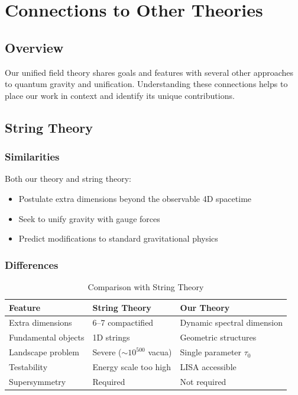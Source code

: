\section{Connections to Other Theories}
\label{sec:connections}

\subsection{Overview}

Our unified field theory shares goals and features with several other approaches to quantum gravity and unification. Understanding these connections helps to place our work in context and identify its unique contributions.

\subsection{String Theory}

\subsubsection{Similarities}

Both our theory and string theory:
\begin{itemize}
    \item Postulate extra dimensions beyond the observable 4D spacetime
    \item Seek to unify gravity with gauge forces
    \item Predict modifications to standard gravitational physics
\end{itemize}

\subsubsection{Differences}

\begin{table}[htbp]
\centering
\caption{Comparison with String Theory}
\label{tab:string_comparison}
\begin{tabular}{p{4cm}p{4cm}p{4cm}}
\hline
\textbf{Feature} & \textbf{String Theory} & \textbf{Our Theory} \\
\hline
Extra dimensions & 6--7 compactified & Dynamic spectral dimension \\
Fundamental objects & 1D strings & Geometric structures \\
Landscape problem & Severe ($\sim 10^{500}$ vacua) & Single parameter $\tau_0$ \\
Testability & Energy scale too high & LISA accessible \\
Supersymmetry & Required & Not required \\
\hline
\end{tabular}
\end{table}

